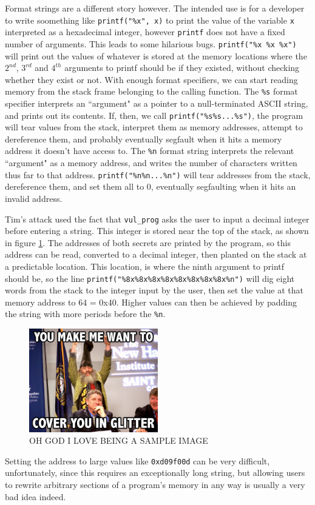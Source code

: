 Format strings are a different story however. The intended use is for a developer to write soomething like {\tt printf("\%x", x)} to print the value of the variable {\tt x} interpreted as a hexadecimal integer, however {\tt printf} does not have a fixed number of arguments. This leads to some hilarious bugs. {\tt printf("\%x \%x \%x")} will print out the values of whatever is stored at the memory locations where the $2^{nd}$, $3^{rd}$ and $4^{th}$ arguments to printf should be if they existed, without checking whether they exist or not. With enough format specifiers, we can start reading memory from the stack frame belonging to the calling function. The {\tt \%s} format specifier interprets an ``argument" as a pointer to a null-terminated ASCII string, and prints out its contents. If, then, we call {\tt printf("\%s\%s...\%s")}, the program will tear values from the stack, interpret them as memory addresses, attempt to dereference them, and probably eventually segfault when it hits a memory address it doesn't have access to. The {\tt \%n} format string interprets the relevant ``argument" as a memory address, and writes the number of characters written thus far to that address. {\tt printf("\%n\%n...\%n")} will tear addresses from the stack, dereference them, and set them all to 0, eventually segfaulting when it hits an invalid address.

Tim's attack used the fact that {\tt vul\_prog} asks the user to input a decimal integer before entering a string. This integer is stored near the top of the stack, as shown in figure \ref{fig_vul_prog_stack}. The addresses of both secrets are printed by the program, so this address can be read, converted to a decimal integer, then planted on the stack at a predictable location. This location, is where the ninth argument to printf should be, so the line {\tt printf("\%8x\%8x\%8x\%8x\%8x\%8x\%8x\%8x\%n")} will dig eight words from the stack to the integer input by the user, then set the value at that memory address to 64 = 0x40. Higher values can then be achieved by padding the string with more periods before the {\tt \%n}.


\begin{figure}[h]
\centering
\includegraphics[width = 0.5\textwidth]{./images/placeholder.jpg}
\caption{OH GOD I LOVE BEING A SAMPLE IMAGE}
\label{fig_vul_prog_stack}
\end{figure}



Setting the address to large values like {\tt 0xd09f00d} can be very difficult, unfortunately, since this requires an exceptionally long string, but allowing users to rewrite arbitrary sections of a program's memory in any way is usually a very bad idea indeed.
